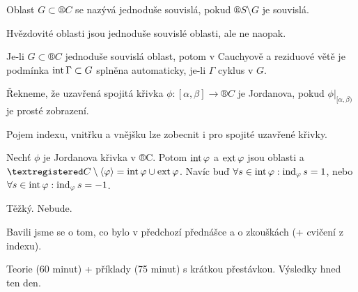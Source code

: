 \documentclass[12pt]{article}					%
\begin{document}
\begin{definice}
	Oblast $G \subset ®C$ se nazývá jednoduše souvislá, pokud $®S \setminus G$ je souvislá.
\end{definice}

\begin{poznamka}
	Hvězdovité oblasti jsou jednoduše souvislé oblasti, ale ne naopak.

	Je-li $G \subset ®C$ jednoduše souvislá oblast, potom v Cauchyově a reziduové větě je podmínka $\operatorname{int} \Gamma \subset G$ splněna automaticky, je-li $\Gamma$ cyklus v $G$.
\end{poznamka}

\begin{definice}
	Řekneme, že uzavřená spojitá křivka $\phi: [\alpha, \beta] \rightarrow ®C$ je Jordanova, pokud $\phi|_{[\alpha, \beta)}$ je prosté zobrazení.
\end{definice}

\begin{poznamka}
	Pojem indexu, vnitřku a vnějšku lze zobecnit i pro spojité uzavřené křivky.
\end{poznamka}

\begin{veta}
	Nechť $\phi$ je Jordanova křivka v ®C. Potom $\operatorname{int} \varphi$ a $\operatorname{ext} \varphi$ jsou oblasti a $®C \setminus \<\phi\> = \Int \phi \cup \Ext \phi$. Navíc buď $\forall s \in \operatorname{int} \varphi : \operatorname{ind}_\varphi s = 1$, nebo $\forall s \in \operatorname{int} \varphi: \operatorname{ind}_\varphi s = -1$.

	\begin{dukazin}
		Těžký. Nebude.
	\end{dukazin}
\end{veta}


\begin{poznamka}
	Bavili jsme se o tom, co bylo v předchozí přednášce a o zkouškách (+ cvičení z indexu).
\end{poznamka}

\begin{poznamka}[Písemka]
	Teorie (60 minut) + příklady (75 minut) s krátkou přestávkou. Výsledky hned ten den.
\end{poznamka}
\end{document}
